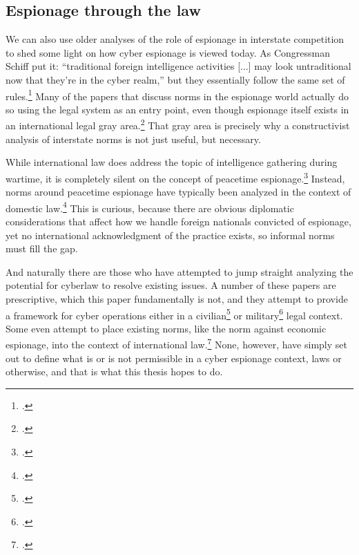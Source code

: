 \documentclass{memoir}
\begin{document}
\begin{refsegment}
\subsection{Espionage through the law}
We can also use older analyses of the role of espionage in interstate competition to shed some light on how cyber espionage is viewed today. As Congressman Schiff put it: ``traditional foreign intelligence activities [...] may look untraditional now that they’re in the cyber realm,'' but they essentially follow the same set of rules.\footcite{nakashima_hacks_2015} Many of the papers that discuss norms in the espionage world actually do so using the legal system as an entry point, even though espionage itself exists in an international legal gray area.\footcite{beim_enforcing_2018} That gray area is precisely why a constructivist analysis of interstate norms is not just useful, but necessary.

While international law does address the topic of intelligence gathering during wartime, it is completely silent on the concept of peacetime espionage.\footcite{radsan_unresolved_2007} Instead, norms around peacetime espionage have typically been analyzed in the context of domestic law.\footcite{demarest_espionage_1995} This is curious, because there are obvious diplomatic considerations that affect how we handle foreign nationals convicted of espionage, yet no international acknowledgment of the practice exists, so informal norms must fill the gap.

And naturally there are those who have attempted to jump straight analyzing the potential for cyberlaw to resolve existing issues. A number of these papers are prescriptive, which this paper fundamentally is not, and they attempt to provide a framework for cyber operations either in a civilian\footcite{yurcik_internet_2001} or military\footcite{kehler_rules_2017} legal context. Some even attempt to place existing norms, like the norm against economic espionage, into the context of international law.\footcite{lotrionte_countering_2015} None, however, have simply set out to define what is or is not permissible in a cyber espionage context, laws or otherwise, and that is what this thesis hopes to do.





\end{refsegment}
\end{document}
